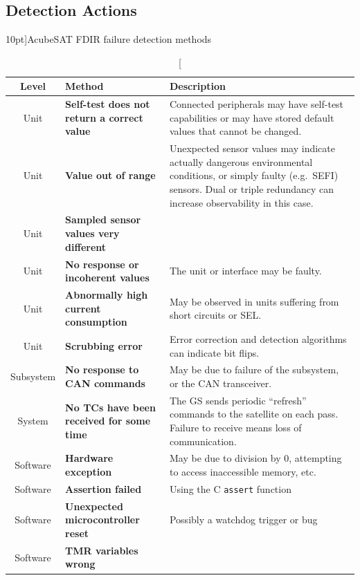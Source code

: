 \documentclass[a4paper,nobib]{tufte-book}
\begin{document}
\subsection{Detection Actions}
\begin{table}[h]
	\centering
	\caption[][10pt]{AcubeSAT \acs{FDIR} failure detection methods}
	\label{tab:fdir_detect}
	\renewcommand{\arraystretch}{1.3}
	\begin{tabularx}{\textwidth}{@{}cL{5cm}X@{}}
		\toprule
		Level & Method & Description \\ \midrule
		Unit & \textbf{Self-test does not return a correct value} & Connected peripherals may have self-test capabilities or may have stored default values that cannot be changed. \\
		Unit & \textbf{Value out of range} & Unexpected sensor values may indicate actually dangerous environmental conditions, or simply faulty (e.g.\ \acs{SEFI}) sensors. Dual or triple redundancy can increase observability in this case. \\
		Unit & \textbf{Sampled sensor values very different} & \\
		Unit & \textbf{No response or incoherent values} & The unit or interface may be faulty. \\
		Unit & \textbf{Abnormally high current consumption} & May be observed in units suffering from short circuits or \acs{SEL}. \\
		Unit & \textbf{Scrubbing error} & Error correction and detection algorithms can indicate bit flips. \\
		Subsystem & \textbf{No response to \acs{CAN} commands} & May be due to failure of the subsystem, or the \acs{CAN} transceiver. \\
		System & \textbf{No \acsp{TC} have been received for some time} & The \acs{GS} sends periodic ``refresh'' commands to the satellite on each pass. Failure to receive means loss of communication. \\
		Software & \textbf{Hardware exception} & May be due to division by 0, attempting to access inaccessible memory, etc. \\
		Software & \textbf{Assertion failed} & Using the C \texttt{assert} function \\
		Software & \textbf{Unexpected microcontroller reset} & Possibly a watchdog trigger \parencite{beningo_review_watchdog_2018} or bug \\
		Software & \textbf{\acs{TMR} variables wrong} & \\ \bottomrule
	\end{tabularx}
\end{table}
\end{document}
